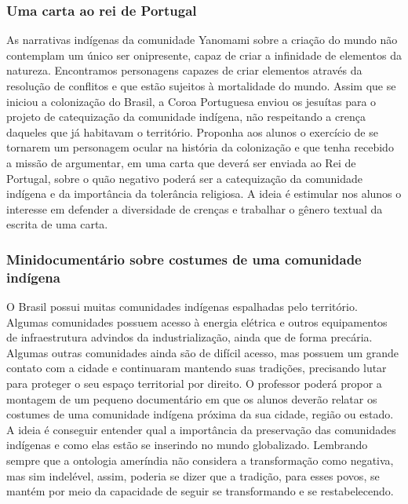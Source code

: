\documentclass[12pt]{extarticle}
\begin{document}
\subsubsection{Uma carta ao rei de Portugal}


  As narrativas indígenas da comunidade Yanomami sobre a criação do
  mundo não contemplam um único ser onipresente, capaz de criar a
  infinidade de elementos da natureza. Encontramos personagens capazes
  de criar elementos através da resolução de conflitos e que estão sujeitos
  à mortalidade do mundo. Assim que se iniciou a colonização do Brasil,
  a Coroa Portuguesa enviou os jesuítas para o projeto de catequização
  da comunidade indígena, não respeitando a crença daqueles que já
  habitavam o território. Proponha aos alunos o exercício de se tornarem
  um personagem ocular na história da colonização e que tenha recebido a
  missão de argumentar, em uma carta que deverá ser enviada ao Rei de
  Portugal, sobre o quão negativo poderá ser a catequização da
  comunidade indígena e da importância da tolerância religiosa. A ideia
  é estimular nos alunos o interesse em defender a diversidade de crenças
  e trabalhar o gênero textual da escrita de uma carta.


\subsubsection{Minidocumentário sobre costumes de uma comunidade indígena}


  O Brasil possui muitas comunidades indígenas espalhadas pelo
  território. Algumas comunidades possuem acesso à energia elétrica e
  outros equipamentos de infraestrutura advindos da industrialização, ainda que de forma
  precária. Algumas outras comunidades ainda são de difícil acesso, mas
  possuem um grande contato com a cidade e continuaram mantendo suas
  tradições, precisando lutar para proteger o seu espaço territorial por
  direito. O professor poderá propor a montagem de um pequeno
  documentário em que os alunos deverão relatar os costumes de uma
  comunidade indígena próxima da sua cidade, região ou estado. A ideia é
  conseguir entender qual a importância da preservação das comunidades
  indígenas e como elas estão se inserindo no mundo globalizado. Lembrando sempre que 
  a ontologia ameríndia não considera a transformação como negativa, mas sim indelével, assim, 
  poderia se dizer que a tradição, para esses povos, se mantém por meio da capacidade de seguir
  se transformando e se restabelecendo.
\end{document}
